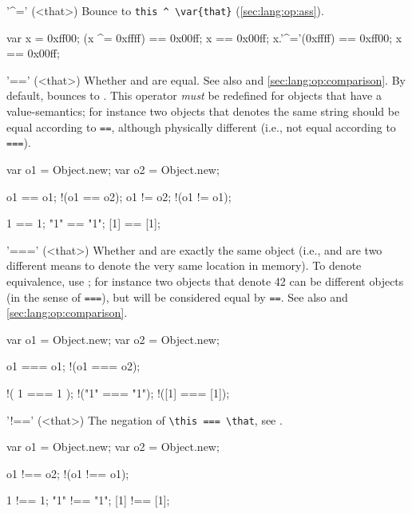 \begin{urbiscriptapi}
\item['^='](<that>)%
  Bounce to \lstinline|this ^ \var{that}| (\autoref{sec:lang:op:ass}).
\begin{urbiassert}
var x = 0xff00;
(x ^= 0xffff)  == 0x00ff;  x == 0x00ff;
x.'^='(0xffff) == 0xff00;  x == 0x00ff;
\end{urbiassert}



\item['=='](<that>)%
  Whether \this and \that are equal.  See also  and
  \autoref{sec:lang:op:comparison}.  By default, bounces to
  .  This operator \emph{must} be redefined for objects that
  have a value-semantics; for instance two  objects that
  denotes the same string should be equal according to \lstinline|==|,
  although physically different (i.e., not equal according to
  \lstinline|===|).
\begin{urbiassert}
var o1 = Object.new;
var o2 = Object.new;

      o1 == o1;
    !(o1 == o2);
      o1 != o2;
    !(o1 != o1);

      1  ==  1;
     "1" == "1";
     [1] == [1];
\end{urbiassert}

\item['==='](<that>)%
  Whether \this and \that are exactly the same object (i.e., \this and \that
  are two different means to denote the very same location in memory).  To
  denote equivalence, use ; for instance two 
  objects that denote 42 can be different objects (in the sense of
  \lstinline|===|), but will be considered equal by \lstinline|==|.  See
  also  and \autoref{sec:lang:op:comparison}.
\begin{urbiassert}
var o1 = Object.new;
var o2 = Object.new;

      o1 === o1;
    !(o1 === o2);

    !( 1  ===  1 );
    !("1" === "1");
    !([1] === [1]);
\end{urbiassert}

\item['!=='](<that>)
  The negation of \lstinline|\this === \that|, see .
\begin{urbiassert}
var o1 = Object.new;
var o2 = Object.new;

      o1 !== o2;
    !(o1 !== o1);

      1  !==  1;
     "1" !== "1";
     [1] !== [1];
\end{urbiassert}

\end{urbiscriptapi}

